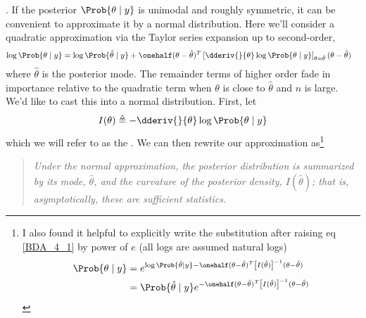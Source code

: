 \documentclass[11pt]{article}
\newcommand\p{\Needspace{10\baselineskip} \noindent}
\begin{document}


\p {}. If the posterior $\Prob{\theta \mid y}$ is unimodal and roughly symmetric, it can be convenient to approximate it by a normal distribution. Here we'll consider a quadratic approximation via the Taylor series expansion up to second-order,
\begin{align}
	\log \Prob{\theta \mid y}
	&= \log \Prob{\hat{\theta} \mid y} + 
		\onehalf (\theta - \hat{\theta})^T \left[ \dderiv{}{\theta} \log \Prob{\theta \mid y} \right]_{\theta = \hat{\theta}} (\theta - \hat{\theta}) \label{BDA_4_1}
\end{align}
where $\hat{\theta}$ is the posterior mode. The remainder terms of higher order fade in importance relative to the quadratic term when $\theta$ is close to $\hat{\theta}$ and $n$ is large. We'd like to cast this into a normal distribution. First, let
\begin{align}
	I(\theta) \triangleq - \dderiv{}{\theta} \log \Prob{\theta \mid y}
\end{align}
which we will refer to as the . We can then rewrite our approximation as\footnote{I also found it helpful to explicitly write the substitution after raising eq \ref{BDA_4_1} by power of $e$ (all logs are assumed natural logs)
\begin{align}
 \Prob{\theta \mid y} &= e^{\log\Prob{\hat{\theta} \mid y}  - \onehalf (\theta - \hat{\theta})^T \left[I(\hat{\theta}) \right]^{-1} (\theta - \hat{\theta})} \\
 &= \Prob{\hat{\theta} \mid y} e^{- \onehalf (\theta - \hat{\theta})^T \left[I(\hat{\theta}) \right]^{-1} (\theta - \hat{\theta})}
\end{align}
}
\begin{quote}
	{\itshape Under the normal approximation, the posterior distribution is summarized by its mode, $\hat{\theta}$, and the curvature of the posterior density, $I(\hat{\theta})$; that is, asymptotically, these are sufficient statistics.}
\end{quote}
\end{document}
